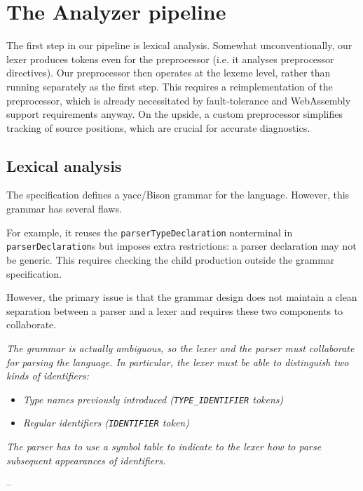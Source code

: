 \section{The  Analyzer pipeline}

The first step in our pipeline is lexical analysis. Somewhat unconventionally,
our lexer produces tokens even for the preprocessor (i.e. it analyses
preprocessor directives). Our preprocessor then operates at the lexeme level,
rather than running separately as the first step. This requires a
reimplementation of the preprocessor, which is already necessitated by
fault-tolerance and WebAssembly support requirements anyway. On the upside, a
custom preprocessor simplifies tracking of source positions, which are crucial
for accurate diagnostics.

\subsection{Lexical analysis}

The \pfs specification defines a \acrshort{yacc}/Bison grammar for the language. However, this grammar has
several flaws.

For example, it reuses the \texttt{parserTypeDeclaration} non\-terminal in
\texttt{parserDeclaration}s but imposes extra restrictions: a parser declaration
may not be generic. This requires checking the child production outside the
grammar specification.

However, the primary issue is that the grammar design does not maintain a clean
separation between a parser and a lexer and requires these two components to
collaborate.

\begin{displayquote}
	\textit{The grammar is actually ambiguous, so the lexer and the parser must
	collaborate for parsing the language. In particular, the lexer must be able
	to distinguish two kinds of identifiers:}

	\begin{itemize}
		\item \textit{Type names previously introduced (\texttt{TYPE\_IDENTIFIER}
		tokens)}
		\item \textit{Regular identifiers (\texttt{IDENTIFIER} token)}
	\end{itemize}

	\textit{The parser has to use a symbol table to indicate to the lexer how to
	parse subsequent appearances of identifiers.}

	--  \cite{p416:v123:spec}
\end{displayquote}

